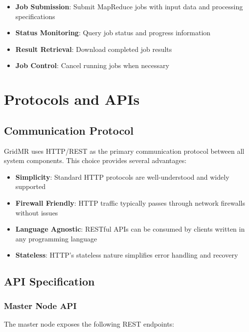 \documentclass[11pt,letterpaper,oneside]{article}
\begin{document}
\begin{itemize}
    \item \textbf{Job Submission}: Submit MapReduce jobs with input data and processing specifications
    \item \textbf{Status Monitoring}: Query job status and progress information
    \item \textbf{Result Retrieval}: Download completed job results
    \item \textbf{Job Control}: Cancel running jobs when necessary
\end{itemize}


\section{Protocols and APIs}

\subsection{Communication Protocol}

GridMR uses HTTP/REST as the primary communication protocol between all system components. This choice provides several advantages:

\begin{itemize}
    \item \textbf{Simplicity}: Standard HTTP protocols are well-understood and widely supported
    \item \textbf{Firewall Friendly}: HTTP traffic typically passes through network firewalls without issues
    \item \textbf{Language Agnostic}: RESTful APIs can be consumed by clients written in any programming language
    \item \textbf{Stateless}: HTTP's stateless nature simplifies error handling and recovery
\end{itemize}

\subsection{API Specification}

\subsubsection{Master Node API}

The master node exposes the following REST endpoints:
\end{document}
